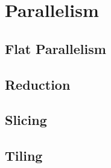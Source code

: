 \chapter{Parallelism}

\section{Flat Parallelism}

\section{Reduction}

\section{Slicing}

\section{Tiling}
